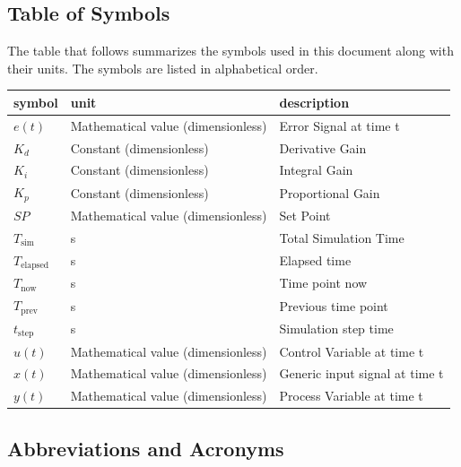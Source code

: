 \documentclass[12pt]{article}
\begin{document}
\subsection{Table of Symbols}

The table that follows summarizes the symbols used in this document along with
their units. The symbols are listed in alphabetical order.

\renewcommand{\arraystretch}{1.2}
\noindent \begin{longtable*}{l l p{9cm}} \toprule
\textbf{symbol} & \textbf{unit} & \textbf{description}\\
\midrule
$e(t)$ & Mathematical value (dimensionless) & Error Signal at time t
\\
$K_d$ & Constant (dimensionless) & Derivative Gain
\\
$K_i$ &  Constant (dimensionless) & Integral Gain
\\
$K_p$ &  Constant (dimensionless) & Proportional Gain
\\
$SP$ & Mathematical value (dimensionless) & Set Point
\\
$T_\text{sim}$ & \si[per-mode=symbol] {\second} & Total Simulation Time
\\
$T_\text{elapsed}$ & \si[per-mode=symbol] {\second} & Elapsed time
\\
$T_\text{now}$ & \si[per-mode=symbol] {\second} & Time point now
\\ 
$T_\text{prev}$ & \si[per-mode=symbol] {\second} & Previous time point
\\
$t_\text{step}$ & \si[per-mode=symbol] {\second} & Simulation step time
\\
$u(t)$ & Mathematical value (dimensionless) & Control Variable at time t
\\
$x(t)$ & Mathematical value (dimensionless) & Generic input signal at time t
\\
$y(t)$ & Mathematical value (dimensionless) & Process Variable at time t
\\ 
\bottomrule
\end{longtable*}

\subsection{Abbreviations and Acronyms}
\end{document}
